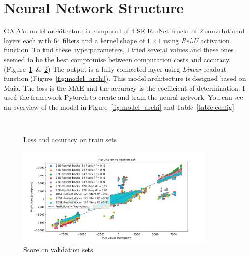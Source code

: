 \documentclass[unnumsec,webpdf,contemporary,large]{Article}%
\theoremstyle{thmstyleone}%
\theoremstyle{thmstyletwo}%
\theoremstyle{thmstylethree}%
\begin{document}
\section{Neural Network Structure}
GAiA's model architecture is composed of $4$ SE-ResNet blocks of $2$ convolutional layers
each with $64$ filters and a kernel shape of $1\times1$ using \textit{ReLU} activation function.
To find these hyperparameters, I tried several values and these ones seemed to be
the best compromise between computation costs and accuracy.
(Figure~\ref{fig:acc_loss}~\&~\ref{fig:score_valid})
The output is a fully connected layer using \textit{Linear} readout function (Figure~\ref{fig:model_archi}).
This model architecture is designed based on Maia\cite{maia}.
The loss is the MAE\cite{mae} and the accuracy is the coefficient of determination\cite{r2}.
I used the framework Pytorch\cite{pytorch} to create and train the neural network.
You can see an overview of the model in Figure~\ref{fig:model_archi} and Table~\ref{table:config}.

\begin{figure}[H]
  \captionsetup[subfigure]{labelformat=empty}
  \centering
  \\
  \caption{Loss and accuracy on train sets}
  \label{fig:acc_loss}
\end{figure}

\begin{figure}[H]
  \centering
  \includegraphics[width=10cm]{model_selection_2.png}
  \caption{Score on validation sets}
  \label{fig:score_valid}
\end{figure}
\end{document}
